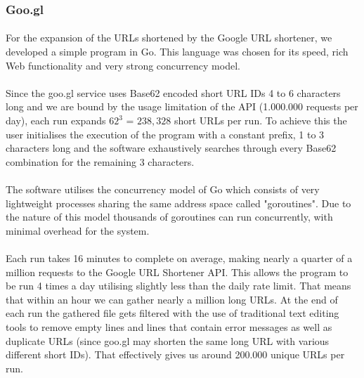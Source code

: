 \documentclass[12pt]{article}
\begin{document}
\subsubsection{Goo.gl}
\paragraph{}
For the expansion of the URLs shortened by the Google URL shortener, we developed a simple program in Go. This language was chosen for its speed, rich Web functionality and very strong concurrency model. 

\paragraph{}
Since the goo.gl service uses Base62 encoded short URL IDs 4 to 6 characters long and we are bound by the usage limitation of the API (1.000.000 requests per day), each run expands $62^{3}$ = $238,328$ short URLs per run. To achieve this the user initialises the execution of the program with a constant prefix, 1 to 3 characters long and the software exhaustively searches through every Base62 combination for the remaining 3 characters.

\paragraph{}
The software utilises the concurrency model of Go which consists of very lightweight processes sharing the same address space called "goroutines". Due to the nature of this model thousands of goroutines can run concurrently, with minimal overhead for the system. 

\paragraph{}
Each run takes 16 minutes to complete on average, making nearly a quarter of a million requests to the Google URL Shortener API. This allows the program to be run 4 times a day utilising slightly less than the daily rate limit. That means that within an hour we can gather nearly a million long URLs. At the end of each run the gathered file gets filtered with the use of traditional text editing tools to remove empty lines and lines that contain error messages as well as duplicate URLs (since goo.gl may shorten the same long URL with various different short IDs). That effectively gives us around 200.000 unique URLs per run. 
\end{document}
